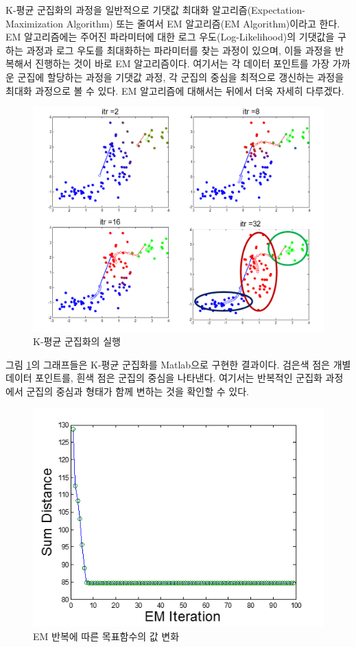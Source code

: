 \documentclass[a4paper]{oblivoir}
\begin{document}
K-평균 군집화의 과정을 일반적으로 기댓값 최대화 알고리즘(Expectation-Maximization Algorithm) 또는 줄여서 EM 알고리즘(EM Algorithm)이라고 한다. EM 알고리즘에는 주어진 파라미터에 대한 로그 우도(Log-Likelihood)의 기댓값을 구하는 과정과 로그 우도를 최대화하는 파라미터를 찾는 과정이 있으며, 이들 과정을 반복해서 진행하는 것이 바로 EM 알고리즘이다. 여기서는 각 데이터 포인트를 가장 가까운 군집에 할당하는 과정을 기댓값 과정, 각 군집의 중심을 최적으로 갱신하는 과정을 최대화 과정으로 볼 수 있다. EM 알고리즘에 대해서는 뒤에서 더욱 자세히 다루겠다. \\

\begin{figure}[ht] \centering 
\includegraphics[scale=0.7]{fig8_6.png} 
\caption{K-평균 군집화의 실행}
\label{fig:8-6}
\end{figure} 

그림 \ref{fig:8-6}의 그래프들은 K-평균 군집화를 Matlab으로 구현한 결과이다. 검은색 점은 개별 데이터 포인트를, 흰색 점은 군집의 중심을 나타낸다. 여기서는 반복적인 군집화 과정에서 군집의 중심과 형태가 함께 변하는 것을 확인할 수 있다. \\

\begin{figure}[ht] \centering 
\includegraphics[scale=1.0]{fig8_5.png} 
\caption{EM 반복에 따른 목표함수의 값 변화}
\label{fig:8-5}
\end{figure} 
\end{document}
